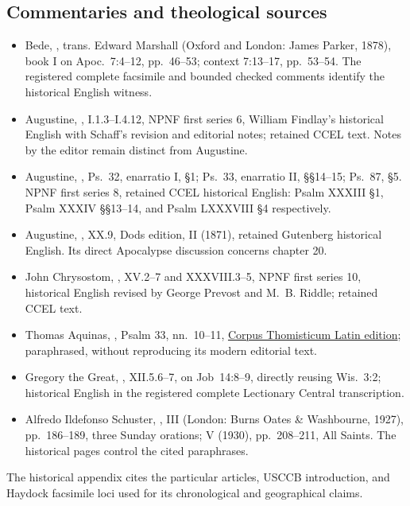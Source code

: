\subsection{Commentaries and theological sources}
\begin{itemize}
\item Bede, , trans.
Edward Marshall (Oxford and London: James Parker, 1878),
book I on Apoc.~7:4--12, pp.~46--53; context 7:13--17,
pp.~53--54. The registered complete facsimile and bounded checked
comments identify the historical English witness.
\item Augustine, ,
I.1.3--I.4.12, NPNF first series 6, William Findlay's historical
English with Schaff's revision and editorial notes; retained
CCEL text. Notes by the editor remain distinct from Augustine.
\item Augustine, , Ps.~32,
enarratio I, \S1; Ps.~33, enarratio II, \S\S14--15;
Ps.~87, \S5. NPNF first series 8, retained CCEL historical
English: Psalm XXXIII \S1, Psalm XXXIV \S\S13--14,
and Psalm LXXXVIII \S4 respectively.
\item Augustine, , XX.9, Dods edition,
II (1871), retained Gutenberg historical English. Its direct
Apocalypse discussion concerns chapter 20.
\item John Chrysostom, , XV.2--7
and XXXVIII.3--5, NPNF first series 10, historical English
revised by George Prevost and M.~B. Riddle; retained CCEL text.
\item Thomas Aquinas, , Psalm 33,
nn.~10--11, \href{https://www.corpusthomisticum.org/cps31.html}{
Corpus Thomisticum Latin edition}; paraphrased, without
reproducing its modern editorial text.
\item Gregory the Great, , XII.5.6--7,
on Job~14:8--9, directly reusing Wis.~3:2; historical
 English in the registered
complete Lectionary Central transcription.
\item Alfredo Ildefonso Schuster, ,
III (London: Burns Oates \& Washbourne, 1927), pp.~186--189,
three Sunday orations; V (1930), pp.~208--211, All Saints.
The historical pages control the cited paraphrases.
\end{itemize}

The historical appendix cites the particular  articles, USCCB introduction, and Haydock
facsimile loci used for its chronological and geographical claims.
